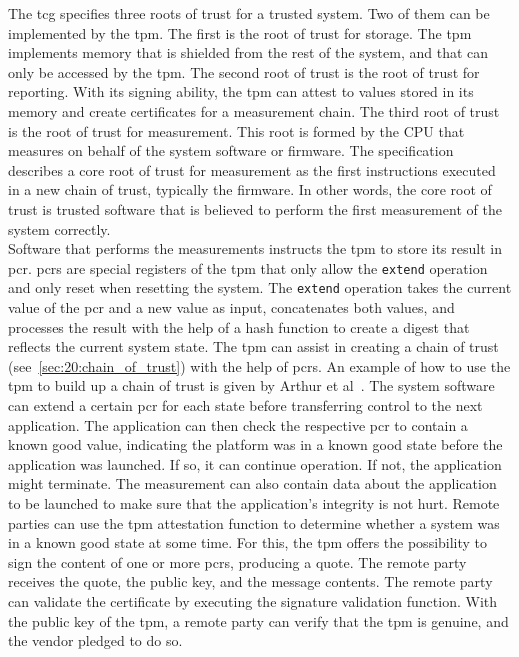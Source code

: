 The \gls{tcg} specifies three roots of trust for a trusted system. Two of them
can be implemented by the \gls{tpm}. The first is the root of trust for storage.
The \gls{tpm} implements memory that is shielded from the rest of the system,
and that can only be accessed by the \gls{tpm}. The second root of trust is the
root of trust for reporting. With its signing ability, the \gls{tpm} can attest
to values stored in its memory and create certificates for a measurement chain.
The third root of trust is the root of trust for measurement. This root is
formed by the CPU that measures on behalf of the system software or firmware.
The specification describes a core root of trust for measurement as the first
instructions executed in a new chain of trust, typically the firmware. In other
words, the core root of trust is trusted software that is believed to perform
the first measurement of the system correctly.\\

Software that performs the measurements instructs the \gls{tpm} to store its
result in \gls{pcr}. \glspl{pcr} are special registers of the \gls{tpm} that
only allow the \texttt{extend} operation and only reset when resetting the
system. The \texttt{extend} operation takes the current value of the \gls{pcr}
and a new value as input, concatenates both values, and processes the result
with the help of a hash function to create a digest that reflects the current
system state. The \gls{tpm} can assist in creating a chain of trust
(see~\ref{sec:20:chain_of_trust}) with the help of \glspl{pcr}. An example of
how to use the \gls{tpm} to build up a chain of trust is given by Arthur et
al~\cite{arthur2015practical}. The system software can extend a certain
\gls{pcr} for each state before transferring control to the next application.
The application can then check the respective \gls{pcr} to contain a known good
value, indicating the platform was in a known good state before the application
was launched. If so, it can continue operation. If not, the application might
terminate. The measurement can also contain data about the application to be
launched to make sure that the application's integrity is not hurt. Remote
parties can use the \gls{tpm} attestation function to determine whether a system
was in a known good state at some time. For this, the \gls{tpm} offers the
possibility to sign the content of one or more \glspl{pcr}, producing a quote.
The remote party receives the quote, the public key, and the message contents.
The remote party can validate the certificate by executing the signature
validation function. With the public key of the \gls{tpm}, a remote party can
verify that the \gls{tpm} is genuine, and the vendor pledged to do so.
